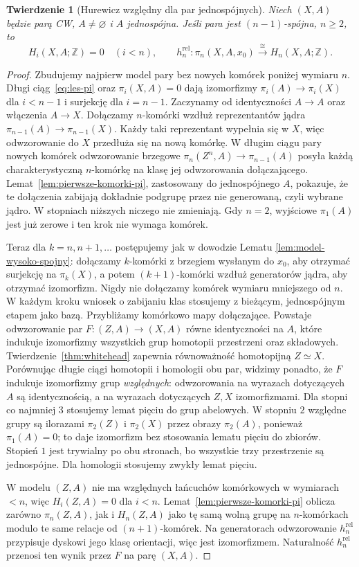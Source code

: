 \documentclass[11pt,a4paper,oneside]{report}
\newcommand{\Z}{\mathbb{Z}}
\theoremstyle{plain}
\newtheorem{twierdzenie}{Twierdzenie}[section]
\theoremstyle{definition}
\theoremstyle{remark}
\begin{document}
\begin{twierdzenie}[Hurewicz względny dla par jednospójnych]
\label{thm:hurewicz-wzgledny}
Niech $(X,A)$ będzie parą CW,
$A\ne\varnothing$ i $A$
jednospójna. Jeśli para
jest $(n-1)$-spójna,
$n\geq2$, to
\[
 H_i(X,A;\Z)=0\quad(i<n),
 \qquad
 h_n^{\mathrm{rel}}:
 \pi_n(X,A,x_0)
 \xrightarrow{\ \cong\ }
 H_n(X,A;\Z).
\]
\end{twierdzenie}
\begin{proof}
Zbudujemy najpierw
model pary bez nowych
komórek poniżej
wymiaru $n$.
Długi ciąg~\eqref{eq:les-pi}
oraz $\pi_i(X,A)=0$
dają izomorfizmy
$\pi_i(A)\to\pi_i(X)$
dla $i<n-1$ i
surjekcję dla
$i=n-1$.
Zaczynamy od
identyczności $A\to A$
oraz włączenia $A\to X$.
Dołączamy $n$-komórki
wzdłuż reprezentantów
jądra
$\pi_{n-1}(A)\to
\pi_{n-1}(X)$.
Każdy taki reprezentant
wypełnia się w $X$,
więc odwzorowanie do $X$
przedłuża się na
nową komórkę.
W długim ciągu
pary nowych komórek
odwzorowanie brzegowe
$\pi_n(Z^n,A)\to
\pi_{n-1}(A)$
posyła każdą
charakterystyczną
$n$-komórkę na
klasę jej odwzorowania
dołączającego.
Lemat~\ref{lem:pierwsze-komorki-pi},
zastosowany do
jednospójnego $A$,
pokazuje, że
te dołączenia
zabijają dokładnie
podgrupę przez
nie generowaną,
czyli wybrane jądro.
W stopniach
niższych niczego
nie zmieniają.
Gdy $n=2$,
wyjściowe $\pi_1(A)$
jest już zerowe
i ten krok nie
wymaga komórek.

Teraz dla $k=n,n+1,\ldots$
postępujemy jak w
dowodzie Lematu
\ref{lem:model-wysoko-spojny}:
dołączamy $k$-komórki
z brzegiem wysłanym
do $x_0$, aby
otrzymać surjekcję
na $\pi_k(X)$,
a potem
$(k+1)$-komórki
wzdłuż generatorów
jądra, aby
otrzymać izomorfizm.
Nigdy nie dołączamy
komórek wymiaru
mniejszego od $n$.
W każdym kroku wniosek o zabijaniu klas stosujemy z bieżącym,
jednospójnym etapem jako bazą. Przybliżamy komórkowo mapy dołączające.
Powstaje odwzorowanie par $F:(Z,A)\to(X,A)$
równe identyczności na $A$, które
indukuje izomorfizmy
wszystkich grup
homotopii przestrzeni
oraz składowych.
Twierdzenie~\ref{thm:whitehead}
zapewnia równoważność
homotopijną $Z\simeq X$.
Porównując długie ciągi
homotopii i homologii
obu par, widzimy
ponadto, że $F$
indukuje izomorfizmy
grup \emph{względnych}:
odwzorowania na wyrazach dotyczących $A$ są identycznością,
a na wyrazach dotyczących $Z,X$ izomorfizmami.
Dla stopni co najmniej $3$ stosujemy lemat pięciu do grup abelowych.
W stopniu $2$ względne grupy są ilorazami $\pi_2(Z)$ i $\pi_2(X)$
przez obrazy $\pi_2(A)$, ponieważ $\pi_1(A)=0$;
to daje izomorfizm bez stosowania lematu pięciu do zbiorów.
Stopień $1$ jest trywialny po obu stronach, bo wszystkie trzy przestrzenie
są jednospójne. Dla homologii stosujemy zwykły lemat pięciu.

W modelu $(Z,A)$
nie ma względnych
łańcuchów komórkowych
w wymiarach $<n$,
więc $H_i(Z,A)=0$
dla $i<n$.
Lemat~\ref{lem:pierwsze-komorki-pi}
oblicza zarówno
$\pi_n(Z,A)$,
jak i $H_n(Z,A)$
jako tę samą
wolną grupę na
$n$-komórkach
modulo te same
relacje od
$(n+1)$-komórek.
Na generatorach
odwzorowanie $h_n^{\mathrm{rel}}$
przypisuje dyskowi
jego klasę orientacji,
więc jest izomorfizmem.
Naturalność
$h_n^{\mathrm{rel}}$
przenosi ten wynik
przez $F$
na parę $(X,A)$.
\end{proof}
\end{document}
